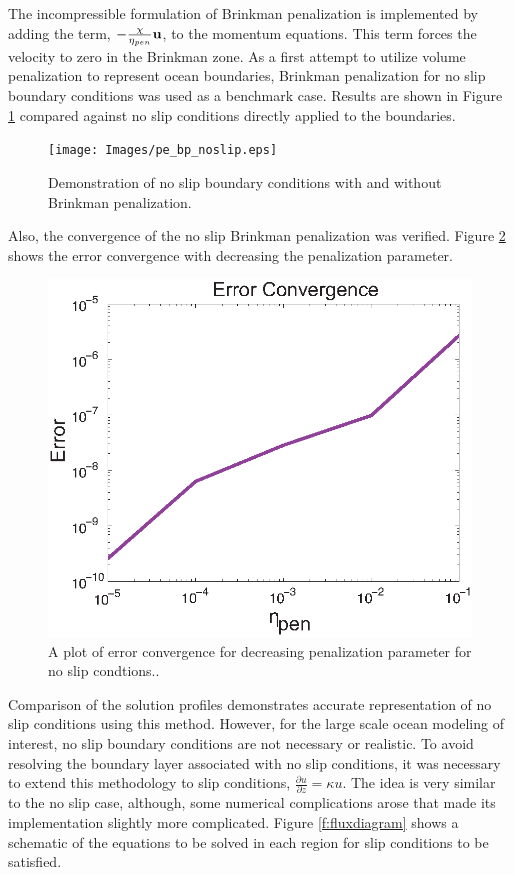 The incompressible formulation of Brinkman penalization \cite{84AC} is implemented by adding the term, $- \frac{\chi}{\eta_{pen}} {\bf u}$, to the momentum equations.  This term forces the velocity to zero in the Brinkman zone.  As a first attempt to utilize volume penalization to represent ocean boundaries, Brinkman penalization for no slip boundary conditions was used as a benchmark case.  Results are shown in Figure \ref{f:noslip} compared against no slip conditions directly applied to the boundaries.

\begin{center}
\begin{figure}[htp]
\centering
  \texttt{[image: Images/pe\_bp\_noslip.eps]}
  \caption[No slip conditions with and without Brinkman]{Demonstration of no slip boundary conditions with and without Brinkman penalization.}\label{f:noslip}
\end{figure}
\end{center}

Also, the convergence of the no slip Brinkman penalization was verified.  Figure \ref{f:errorconverge_noslip} shows the error convergence with decreasing the penalization parameter.  

\begin{center}
\begin{figure}[htp]
\centering
  \includegraphics[width=3 in]{Images/errorconverge_noslip.eps}
  \caption[Error convergence for no slip conditions]{A plot of error convergence for decreasing penalization parameter for no slip condtions..}\label{f:errorconverge_noslip}
\end{figure}
\end{center}

Comparison of the solution profiles demonstrates accurate representation of no slip conditions using this method.  However, for the large scale ocean modeling of interest, no slip boundary conditions are not necessary or realistic. To avoid resolving the boundary layer associated with no slip conditions, it was necessary to extend this methodology to slip conditions, $\frac{\partial u}{\partial z}=\kappa u$.  The idea is very similar to the no slip case, although, some numerical complications arose that made its implementation slightly more complicated.  Figure \ref{f:fluxdiagram} shows a schematic of the equations to be solved in each region for slip conditions to be satisfied.

